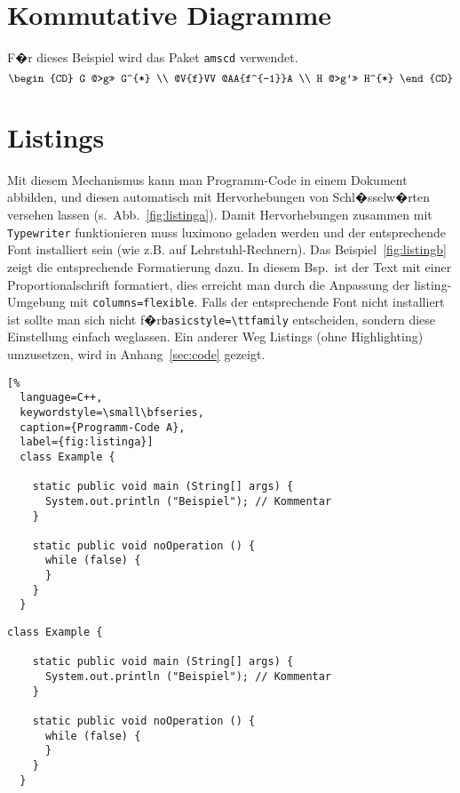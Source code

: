 \section{Kommutative Diagramme}
\label{sec:commutative}

F�r dieses Beispiel wird das Paket \lstinline!amscd! verwendet.%
%
\begin{equation*}
  \begin{CD}
    G @>g>> G^{*} \\
    @V{f}VV @AA{f^{-1}}A \\
    H @>g'>> H^{*}
  \end{CD}
\end{equation*}


\section{Listings}

Mit diesem Mechanismus kann man Programm-Code in einem Dokument abbilden, und
diesen automatisch mit Hervorhebungen von Schl�sselw�rten versehen lassen
(s.~Abb.~\ref{fig:listinga}). Damit Hervorhebungen zusammen mit
\texttt{Typewriter} funktionieren muss luximono geladen werden und der
entsprechende Font installiert sein (wie z.B. auf Lehrstuhl-Rechnern). Das
Beispiel~\ref{fig:listingb} zeigt die entsprechende Formatierung dazu. In
diesem Bsp.\ ist der Text mit einer Proportionalschrift formatiert, dies
erreicht man durch die Anpassung der listing-Umgebung mit
\lstinline!columns=flexible!.  Falls der entsprechende Font nicht installiert
ist sollte man sich nicht f�r\linebreak\lstinline!basicstyle=\ttfamily!
entscheiden, sondern diese Einstellung einfach weglassen. Ein anderer Weg
Listings (ohne Highlighting) umzusetzen, wird in Anhang~\ref{sec:code}
gezeigt.

{\centering
\lstset{
  language=Java,
  columns=flexible,
  basicstyle=\ttfamily\small   %
}
\begin{lstlisting}[%
  language=C++,
  keywordstyle=\small\bfseries,
  caption={Programm-Code A},
  label={fig:listinga}]
  class Example {
    
    static public void main (String[] args) {
      System.out.println ("Beispiel"); // Kommentar
    } 
    
    static public void noOperation () {
      while (false) {
      }
    } 
  }
\end{lstlisting}

\lstset{
  language=Java,
}

\begin{lstlisting}[caption={Programm-Code B},label={fig:listingb}]
  class Example {
    
    static public void main (String[] args) {
      System.out.println ("Beispiel"); // Kommentar
    } 
    
    static public void noOperation () {
      while (false) {
      }
    } 
  }
\end{lstlisting}
}

